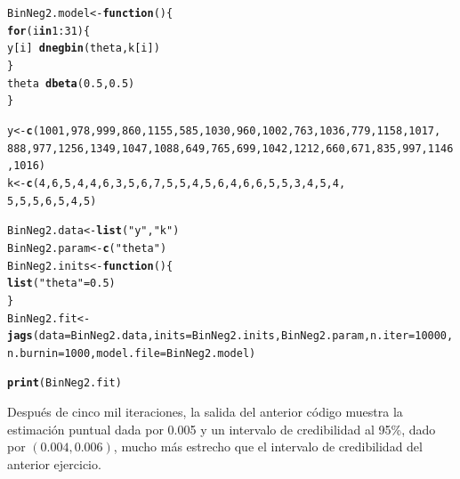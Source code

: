 \documentclass[10pt,openright]{book}\usepackage[]{graphicx}\usepackage[]{color}
\makeatletter
\newcommand{\hlnum}[1]{\textcolor[rgb]{0.686,0.059,0.569}{#1}}%
\newcommand{\hlstr}[1]{\textcolor[rgb]{0.192,0.494,0.8}{#1}}%
\newcommand{\hlopt}[1]{\textcolor[rgb]{0,0,0}{#1}}%
\newcommand{\hlstd}[1]{\textcolor[rgb]{0.345,0.345,0.345}{#1}}%
\newcommand{\hlkwa}[1]{\textcolor[rgb]{0.161,0.373,0.58}{\textbf{#1}}}%
\newcommand{\hlkwb}[1]{\textcolor[rgb]{0.69,0.353,0.396}{#1}}%
\newcommand{\hlkwc}[1]{\textcolor[rgb]{0.333,0.667,0.333}{#1}}%
\newcommand{\hlkwd}[1]{\textcolor[rgb]{0.737,0.353,0.396}{\textbf{#1}}}%
\newenvironment{kframe}{%
 \def\at@end@of@kframe{}%
 \ifinner\ifhmode%
  \def\at@end@of@kframe{\end{minipage}}%
  \begin{minipage}{\columnwidth}%
 \fi\fi%
 \def\FrameCommand##1{\hskip\@totalleftmargin \hskip-\fboxsep
 \colorbox{shadecolor}{##1}\hskip-\fboxsep
     \hskip-\linewidth \hskip-\@totalleftmargin \hskip\columnwidth}%
 \MakeFramed {\advance\hsize-\width
   \@totalleftmargin\z@ \linewidth\hsize
   \@setminipage}}%
 {\par\unskip\endMakeFramed%
 \at@end@of@kframe}
\newenvironment{knitrout}{}{} %
\makeatother
\begin{document}
\begin{Eje}
\begin{knitrout}
\color{fgcolor}\begin{kframe}
\begin{alltt}
\hlstd{BinNeg2.model} \hlkwb{<-} \hlkwa{function}\hlstd{()\{}
\hlkwa{for}\hlstd{(i} \hlkwa{in} \hlnum{1}\hlopt{:}\hlnum{31}\hlstd{)\{}
\hlstd{y[i]}\hlopt{~}\hlkwd{dnegbin}\hlstd{(theta,k[i])}
\hlstd{\}}
\hlstd{theta} \hlopt{~} \hlkwd{dbeta}\hlstd{(}\hlnum{0.5}\hlstd{,} \hlnum{0.5}\hlstd{)}
\hlstd{\}}

\hlstd{y} \hlkwb{<-} \hlkwd{c}\hlstd{(}\hlnum{1001}\hlstd{,} \hlnum{978}\hlstd{,} \hlnum{999}\hlstd{,} \hlnum{860}\hlstd{,} \hlnum{1155}\hlstd{,} \hlnum{585}\hlstd{,} \hlnum{1030}\hlstd{,} \hlnum{960}\hlstd{,} \hlnum{1002}\hlstd{,} \hlnum{763}\hlstd{,} \hlnum{1036}\hlstd{,} \hlnum{779}\hlstd{,} \hlnum{1158}\hlstd{,} \hlnum{1017}\hlstd{,}
       \hlnum{888}\hlstd{,} \hlnum{977}\hlstd{,} \hlnum{1256}\hlstd{,} \hlnum{1349}\hlstd{,} \hlnum{1047}\hlstd{,} \hlnum{1088}\hlstd{,} \hlnum{649}\hlstd{,} \hlnum{765}\hlstd{,} \hlnum{699}\hlstd{,} \hlnum{1042}\hlstd{,} \hlnum{1212}\hlstd{,} \hlnum{660}\hlstd{,} \hlnum{671}\hlstd{,} \hlnum{835}\hlstd{,} \hlnum{997}\hlstd{,} \hlnum{1146}\hlstd{,} \hlnum{1016}\hlstd{)}
\hlstd{k} \hlkwb{<-} \hlkwd{c}\hlstd{(}\hlnum{4}\hlstd{,} \hlnum{6}\hlstd{,} \hlnum{5}\hlstd{,} \hlnum{4}\hlstd{,} \hlnum{4}\hlstd{,} \hlnum{6}\hlstd{,} \hlnum{3}\hlstd{,} \hlnum{5}\hlstd{,} \hlnum{6}\hlstd{,} \hlnum{7}\hlstd{,} \hlnum{5}\hlstd{,} \hlnum{5}\hlstd{,} \hlnum{4}\hlstd{,} \hlnum{5}\hlstd{,} \hlnum{6}\hlstd{,} \hlnum{4}\hlstd{,} \hlnum{6}\hlstd{,} \hlnum{6}\hlstd{,} \hlnum{5}\hlstd{,} \hlnum{5}\hlstd{,} \hlnum{3}\hlstd{,} \hlnum{4}\hlstd{,} \hlnum{5}\hlstd{,} \hlnum{4}\hlstd{,}
       \hlnum{5}\hlstd{,} \hlnum{5}\hlstd{,} \hlnum{5}\hlstd{,} \hlnum{6}\hlstd{,} \hlnum{5}\hlstd{,} \hlnum{4}\hlstd{,} \hlnum{5}\hlstd{)}

\hlstd{BinNeg2.data} \hlkwb{<-} \hlkwd{list}\hlstd{(}\hlstr{"y"}\hlstd{,} \hlstr{"k"}\hlstd{)}
\hlstd{BinNeg2.param} \hlkwb{<-} \hlkwd{c}\hlstd{(}\hlstr{"theta"}\hlstd{)}
\hlstd{BinNeg2.inits} \hlkwb{<-} \hlkwa{function}\hlstd{()\{}
\hlkwd{list}\hlstd{(}\hlstr{"theta"}\hlstd{=}\hlnum{0.5}\hlstd{)}
\hlstd{\}}
\hlstd{BinNeg2.fit} \hlkwb{<-} \hlkwd{jags}\hlstd{(}\hlkwc{data}\hlstd{=BinNeg2.data,} \hlkwc{inits}\hlstd{=BinNeg2.inits, BinNeg2.param,} \hlkwc{n.iter}\hlstd{=}\hlnum{10000}\hlstd{,} \hlkwc{n.burnin}\hlstd{=}\hlnum{1000}\hlstd{,} \hlkwc{model.file}\hlstd{=BinNeg2.model)}

\hlkwd{print}\hlstd{(BinNeg2.fit)}
\end{alltt}
\end{kframe}
\end{knitrout}
    
    Despu\'es de cinco mil iteraciones, la salida del anterior c\'odigo muestra la estimaci\'on puntual dada por 0.005 y un intervalo de credibilidad al 95\%, dado por $(0.004, 0.006)$, mucho m\'as estrecho que el intervalo de credibilidad del anterior ejercicio.
    \end{Eje}
    
\end{document}
